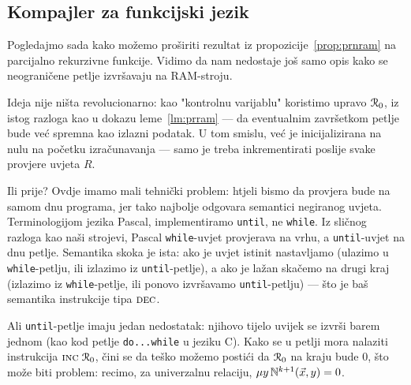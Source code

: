 
\subsection{Kompajler za funkcijski jezik}\label{sec:pir}

Pogledajmo sada kako možemo proširiti rezultat iz propozicije~\ref{prop:prnram} na parcijalno rekurzivne funkcije. Vidimo da nam nedostaje još samo opis kako se neograničene petlje izvršavaju na RAM-stroju.

Ideja nije ništa revolucionarno: kao "kontrolnu varijablu" koristimo upravo $\mathcal R_{0}$, iz istog razloga kao u dokazu leme~\ref{lm:prram} --- da eventualnim završetkom petlje bude već spremna kao izlazni podatak. U tom smislu, već je inicijalizirana na nulu na početku izračunavanja --- samo je treba inkrementirati poslije svake provjere uvjeta $R$.

Ili prije? Ovdje imamo mali tehnički problem: htjeli bismo da provjera bude na samom dnu programa, jer tako najbolje odgovara semantici negiranog uvjeta. Terminologijom jezika Pascal, implementiramo \texttt{until}, ne \texttt{while}. Iz sličnog razloga kao naši strojevi, Pascal \texttt{while}-uvjet provjerava na vrhu, a \texttt{until}-uvjet na dnu petlje. Semantika skoka je ista: ako je uvjet istinit nastavljamo (ulazimo u \texttt{while}-petlju, ili izlazimo iz \texttt{until}-petlje), a ako je lažan skačemo na drugi kraj (izlazimo iz \texttt{while}-petlje, ili ponovo izvršavamo \texttt{until}-petlju) --- što je baš semantika instrukcije tipa $\textsc{dec}$.

Ali \texttt{until}-petlje imaju jedan nedostatak: njihovo tijelo uvijek se izvrši barem jednom (kao kod petlje \texttt{do...while} u jeziku C). Kako se u petlji mora nalaziti instrukcija $\textsc{inc}\;\mathcal R_{0}$, čini se da teško možemo postići da $\mathcal R_{0}$ na kraju bude $0$, što može biti problem: recimo, za univerzalnu relaciju, $\mu y\,{\mathbb N}^{k+1}(\vec x,y)=0$.

